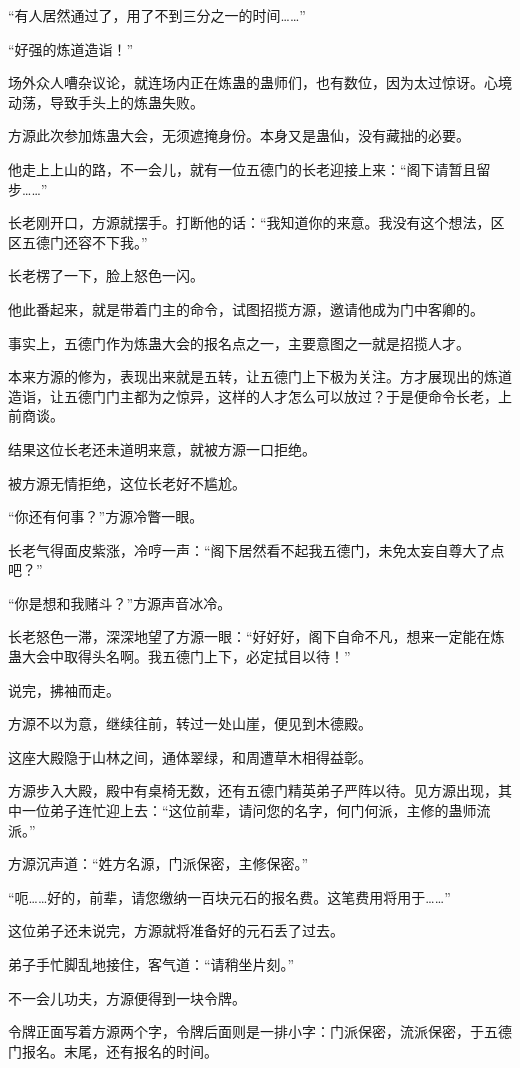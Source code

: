 \begin{this_body}
“有人居然通过了，用了不到三分之一的时间……”

“好强的炼道造诣！”

场外众人嘈杂议论，就连场内正在炼蛊的蛊师们，也有数位，因为太过惊讶。心境动荡，导致手头上的炼蛊失败。

方源此次参加炼蛊大会，无须遮掩身份。本身又是蛊仙，没有藏拙的必要。

他走上上山的路，不一会儿，就有一位五德门的长老迎接上来：“阁下请暂且留步……”

长老刚开口，方源就摆手。打断他的话：“我知道你的来意。我没有这个想法，区区五德门还容不下我。”

长老楞了一下，脸上怒色一闪。

他此番起来，就是带着门主的命令，试图招揽方源，邀请他成为门中客卿的。

事实上，五德门作为炼蛊大会的报名点之一，主要意图之一就是招揽人才。

本来方源的修为，表现出来就是五转，让五德门上下极为关注。方才展现出的炼道造诣，让五德门门主都为之惊异，这样的人才怎么可以放过？于是便命令长老，上前商谈。

结果这位长老还未道明来意，就被方源一口拒绝。

被方源无情拒绝，这位长老好不尴尬。

“你还有何事？”方源冷瞥一眼。

长老气得面皮紫涨，冷哼一声：“阁下居然看不起我五德门，未免太妄自尊大了点吧？”

“你是想和我赌斗？”方源声音冰冷。

长老怒色一滞，深深地望了方源一眼：“好好好，阁下自命不凡，想来一定能在炼蛊大会中取得头名啊。我五德门上下，必定拭目以待！”

说完，拂袖而走。

方源不以为意，继续往前，转过一处山崖，便见到木德殿。

这座大殿隐于山林之间，通体翠绿，和周遭草木相得益彰。

方源步入大殿，殿中有桌椅无数，还有五德门精英弟子严阵以待。见方源出现，其中一位弟子连忙迎上去：“这位前辈，请问您的名字，何门何派，主修的蛊师流派。”

方源沉声道：“姓方名源，门派保密，主修保密。”

“呃……好的，前辈，请您缴纳一百块元石的报名费。这笔费用将用于……”

这位弟子还未说完，方源就将准备好的元石丢了过去。

弟子手忙脚乱地接住，客气道：“请稍坐片刻。”

不一会儿功夫，方源便得到一块令牌。

令牌正面写着方源两个字，令牌后面则是一排小字：门派保密，流派保密，于五德门报名。末尾，还有报名的时间。


\end{this_body}
